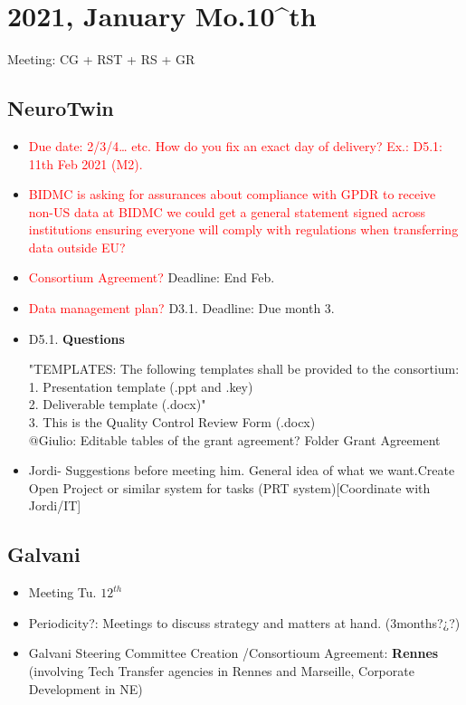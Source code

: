 \section{2021, January Mo.10^{th}}


Meeting: CG + RST + RS + GR 


\subsection{NeuroTwin}
\begin{itemize}
\item \textcolor{red}{Due date: 2/3/4… etc. How do you fix an exact day of delivery? Ex.: D5.1: 11th Feb 2021 (M2).
}
\item	\textcolor{red}{BIDMC is asking for assurances about compliance with GPDR to receive non-US data at BIDMC we could get a general statement signed across institutions ensuring everyone will comply with regulations when transferring data outside EU?}
\item \textcolor{red}{Consortium Agreement?} Deadline: End Feb.
\item \textcolor{red}{Data management plan?} D3.1. Deadline: Due month 3.
\item D5.1. \textbf{Questions}

"TEMPLATES: The following templates shall be provided to the consortium:\\
1.	Presentation template (.ppt and .key)\\
2.	Deliverable template (.docx)"\\
3.  This is the Quality Control Review Form (.docx)\\

$@$Giulio: Editable tables of the grant agreement? Folder Grant Agreement


\item Jordi- Suggestions before meeting him. General idea of what we want.Create Open Project or similar system for tasks (PRT system)[Coordinate with Jordi/IT] 



\end{itemize}


\subsection{Galvani}
\begin{itemize}
    \item Meeting Tu. $12^{th}$
    \item Periodicity?: Meetings to discuss strategy and matters at hand. (3months?¿?)
    \item Galvani Steering Committee Creation /Consortioum Agreement: \textbf{Rennes} (involving Tech Transfer agencies in Rennes and Marseille, Corporate Development in NE)
  

\end{itemize}

